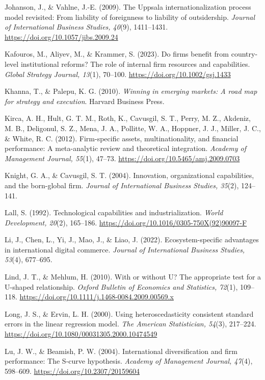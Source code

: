 \documentclass[12pt,a4paper]{article}
\begin{document}
Johanson, J., \& Vahlne, J.-E. (2009). The Uppsala internationalization
process model revisited: From liability of foreignness to liability of
outsidership. \emph{Journal of International Business Studies, 40}(9),
1411--1431. \url{https://doi.org/10.1057/jibs.2009.24}

Kafouros, M., Aliyev, M., \& Krammer, S. (2023). Do firms benefit from
country-level institutional reforms? The role of internal firm resources
and capabilities. \emph{Global Strategy Journal, 13}(1), 70--100.
\url{https://doi.org/10.1002/gsj.1433}

Khanna, T., \& Palepu, K. G. (2010). \emph{Winning in emerging markets:
A road map for strategy and execution}. Harvard Business Press.

Kirca, A. H., Hult, G. T. M., Roth, K., Cavusgil, S. T., Perry, M. Z.,
Akdeniz, M. B., Deligonul, S. Z., Mena, J. A., Pollitte, W. A., Hoppner,
J. J., Miller, J. C., \& White, R. C. (2012). Firm-specific assets,
multinationality, and financial performance: A meta-analytic review and
theoretical integration. \emph{Academy of Management Journal, 55}(1),
47--73. \url{https://doi.org/10.5465/amj.2009.0703}

Knight, G. A., \& Cavusgil, S. T. (2004). Innovation, organizational
capabilities, and the born-global firm. \emph{Journal of International
Business Studies, 35}(2), 124--141.

Lall, S. (1992). Technological capabilities and industrialization.
\emph{World Development, 20}(2), 165--186.
\url{https://doi.org/10.1016/0305-750X(92)90097-F}

Li, J., Chen, L., Yi, J., Mao, J., \& Liao, J. (2022).
Ecosystem-specific advantages in international digital commerce.
\emph{Journal of International Business Studies, 53}(4), 677--695.

Lind, J. T., \& Mehlum, H. (2010). With or without U? The appropriate
test for a U-shaped relationship. \emph{Oxford Bulletin of Economics and
Statistics, 72}(1), 109--118.
\url{https://doi.org/10.1111/j.1468-0084.2009.00569.x}

Long, J. S., \& Ervin, L. H. (2000). Using heteroscedasticity consistent
standard errors in the linear regression model. \emph{The American
Statistician, 54}(3), 217--224.
\url{https://doi.org/10.1080/00031305.2000.10474549}

Lu, J. W., \& Beamish, P. W. (2004). International diversification and
firm performance: The S-curve hypothesis. \emph{Academy of Management
Journal, 47}(4), 598--609. \url{https://doi.org/10.2307/20159604}
\end{document}
